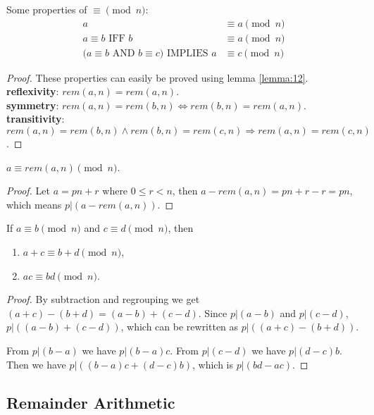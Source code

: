 \documentclass[11pt]{article}
\begin{document}
\begin{lemma}
Some properties of $\equiv \pmod{n}$:
\begin{align*}
a &\equiv a \pmod{n} \tag{reflexivity} \\
a \equiv b \text{ IFF } b &\equiv a \pmod{n} \tag{symmetry} \\
\text{(}a \equiv b \text{ AND } b \equiv c \text{)} \text{ IMPLIES } a &\equiv c \pmod{n}
\tag{transitivity}
\end{align*}
\end{lemma}

\begin{proof}
These properties can easily be proved using lemma \ref{lemma:12}. \\
\textbf{reflexivity}: $rem(a,n) = rem(a,n)$. \\
\textbf{symmetry}: $rem(a,n)=rem(b,n) \Leftrightarrow rem(b,n)=rem(a,n)$. \\
\textbf{transitivity}: $rem(a,n)=rem(b,n) \wedge rem(b,n)=rem(c,n) \Rightarrow rem(a,n)=
rem(c,n)$.
\end{proof}

\begin{lemma} \label{lemma:14}
$a \equiv rem(a,n) \pmod{n}$.
\end{lemma}

\begin{proof}
Let $a = pn + r$ where $0 \leq r < n$, then $a-rem(a,n)=pn+r-r=pn$, which means
$p|(a-rem(a,n))$.
\end{proof}

\begin{lemma} \label{lemma:15}
If $a \equiv b \pmod{n}$ and $c \equiv d \pmod{n}$, then
\begin{enumerate}
\item $a + c \equiv b + d \pmod{n}$,
\item $ac \equiv bd \pmod{n}$.
\end{enumerate}
\end{lemma}

\begin{proof}
By subtraction and regrouping we get $(a+c)-(b+d)=(a-b)+(c-d)$. Since $p|(a-b)$ and
$p|(c-d)$, $p|((a-b)+(c-d))$, which can be rewritten as $p|((a+c)-(b+d))$.

From $p|(b-a)$ we have $p|(b-a)c$. From $p|(c-d)$ we have $p|(d-c)b$. Then we have
$p|( (b-a)c + (d-c)b )$, which is $p|(bd-ac)$.
\end{proof}

\subsection{Remainder Arithmetic}
\end{document}
